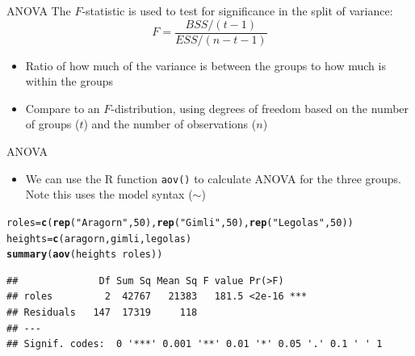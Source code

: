 \documentclass[aspectratio=169]{beamer}\usepackage[]{graphicx}\usepackage[]{color}
\makeatletter
\newcommand{\hlnum}[1]{\textcolor[rgb]{0.686,0.059,0.569}{#1}}%
\newcommand{\hlstr}[1]{\textcolor[rgb]{0.192,0.494,0.8}{#1}}%
\newcommand{\hlopt}[1]{\textcolor[rgb]{0,0,0}{#1}}%
\newcommand{\hlstd}[1]{\textcolor[rgb]{0.345,0.345,0.345}{#1}}%
\newcommand{\hlkwb}[1]{\textcolor[rgb]{0.69,0.353,0.396}{#1}}%
\newcommand{\hlkwd}[1]{\textcolor[rgb]{0.737,0.353,0.396}{\textbf{#1}}}%
\newenvironment{kframe}{%
 \def\at@end@of@kframe{}%
 \ifinner\ifhmode%
  \def\at@end@of@kframe{\end{minipage}}%
  \begin{minipage}{\columnwidth}%
 \fi\fi%
 \def\FrameCommand##1{\hskip\@totalleftmargin \hskip-\fboxsep
 \colorbox{shadecolor}{##1}\hskip-\fboxsep
     \hskip-\linewidth \hskip-\@totalleftmargin \hskip\columnwidth}%
 \MakeFramed {\advance\hsize-\width
   \@totalleftmargin\z@ \linewidth\hsize
   \@setminipage}}%
 {\par\unskip\endMakeFramed%
 \at@end@of@kframe}
\newenvironment{knitrout}{}{} %
\makeatother
\begin{document}
% 

\begin{frame}{ANOVA}
The $F$-statistic is used to test for significance in the split of variance:
\begin{equation}
		F = \frac{BSS/(t-1)}{ESS/(n-t-1)} 
\end{equation}
\begin{itemize}
	\item Ratio of how much of the variance is between the groups to how much is within the groups
	\item Compare to an $F$-distribution, using degrees of freedom based on the number of groups ($t$) and the number of observations ($n$)
\end{itemize}
\end{frame}

\begin{frame}[fragile]{ANOVA}
  \begin{itemize}
    \item We can use the R function \texttt{aov()} to calculate ANOVA for the three groups. Note this uses the model syntax ($\sim$)
  \end{itemize}
\begin{knitrout}\scriptsize
{}\color{fgcolor}\begin{kframe}
\begin{alltt}
\hlstd{roles} \hlkwb{=} \hlkwd{c}\hlstd{(}\hlkwd{rep}\hlstd{(}\hlstr{"Aragorn"}\hlstd{,}\hlnum{50}\hlstd{),} \hlkwd{rep}\hlstd{(}\hlstr{"Gimli"}\hlstd{,}\hlnum{50}\hlstd{),} \hlkwd{rep}\hlstd{(}\hlstr{"Legolas"}\hlstd{,}\hlnum{50}\hlstd{))}
\hlstd{heights} \hlkwb{=} \hlkwd{c}\hlstd{(aragorn, gimli, legolas)}
\hlkwd{summary}\hlstd{(}\hlkwd{aov}\hlstd{(heights} \hlopt{~} \hlstd{roles))}
\end{alltt}
\begin{verbatim}
##              Df Sum Sq Mean Sq F value Pr(>F)    
## roles         2  42767   21383   181.5 <2e-16 ***
## Residuals   147  17319     118                   
## ---
## Signif. codes:  0 '***' 0.001 '**' 0.01 '*' 0.05 '.' 0.1 ' ' 1
\end{verbatim}
\end{kframe}
\end{knitrout}
\end{frame}
\end{document}
